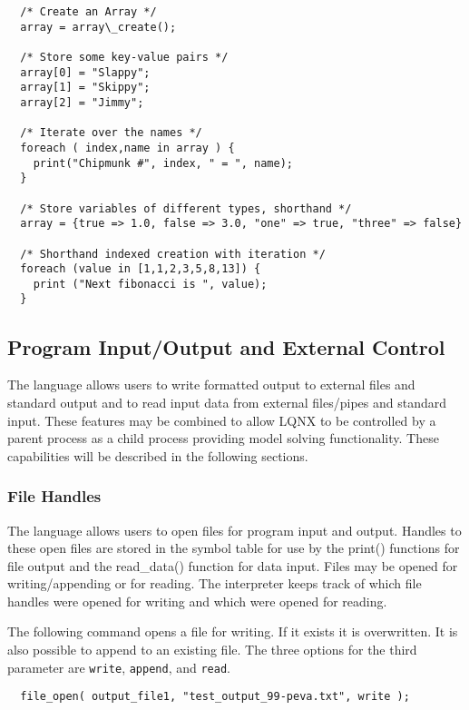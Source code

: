 \lstset{language=C++}
\begin{lstlisting}  
  /* Create an Array */
  array = array\_create();
  
  /* Store some key-value pairs */
  array[0] = "Slappy";
  array[1] = "Skippy";
  array[2] = "Jimmy";
  
  /* Iterate over the names */
  foreach ( index,name in array ) {
    print("Chipmunk #", index, " = ", name);
  }
  
  /* Store variables of different types, shorthand */
  array = {true => 1.0, false => 3.0, "one" => true, "three" => false}
  
  /* Shorthand indexed creation with iteration */
  foreach (value in [1,1,2,3,5,8,13]) {
    print ("Next fibonacci is ", value);
  }
\end{lstlisting}

\subsection{Program Input/Output and External Control}

The \ModLang language allows users to write formatted output to external files and standard output and to read
input data from external files/pipes and standard input. These features may be combined to allow LQNX to be
controlled by a parent process as a child process providing model solving functionality. These capabilities will
be described in the following sections.

\subsubsection{File Handles}

The \ModLang language allows users to open files for program input and output. Handles to these
open files are stored in the symbol table for use by the print() functions for file output and the
read\_data() function for data input. Files may be opened for writing/appending or for reading.
The \ModLang interpreter keeps track of which file handles were opened for writing and which
were opened for reading.

The following command opens a file for writing. If it exists it is overwritten. It is also possible
to append to an existing file. The three options for the third parameter are {\tt write}, {\tt append}, and {\tt read}.

\lstset{language=C++}
\begin{lstlisting}
  file_open( output_file1, "test_output_99-peva.txt", write );
\end{lstlisting}

